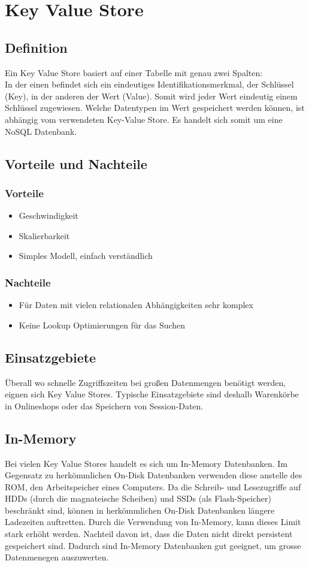 \section{Key Value Store}
\subsection{Definition}
Ein Key Value Store basiert auf einer Tabelle mit genau zwei Spalten: \\
In der einen befindet sich ein eindeutiges Identifikationsmerkmal, der Schlüssel (Key), in der anderen der Wert (Value).
Somit wird jeder Wert eindeutig einem Schlüssel zugewiesen.
Welche Datentypen im Wert gespeichert werden können, ist abhängig vom verwendeten Key-Value Store.
Es handelt sich somit um eine NoSQL Datenbank.
\subsection{Vorteile und Nachteile}
\subsubsection{Vorteile}
\begin{itemize}
	\item Geschwindigkeit
	\item Skalierbarkeit
	\item Simples Modell, einfach verständlich
\end{itemize}
\subsubsection{Nachteile}
\begin{itemize}
	\item Für Daten mit vielen relationalen Abhängigkeiten sehr komplex
	\item Keine Lookup Optimierungen für das Suchen
\end{itemize}
\subsection{Einsatzgebiete}
Überall wo schnelle Zugriffszeiten bei großen Datenmengen benötigt werden, eignen sich Key Value Stores. Typische Einsatzgebiete sind deshalb Warenkörbe in Onlineshops oder das Speichern von Session-Daten.

\subsection{In-Memory}
Bei vielen Key Value Stores handelt es sich um In-Memory Datenbanken. Im Gegensatz zu herkömmlichen On-Disk Datenbanken verwenden diese anstelle des ROM, den Arbeitspeicher eines Computers. Da die Schreib- und Lesezugriffe auf HDDs (durch die magnateische Scheiben) und SSDs (als Flash-Speicher) beschränkt sind, können in herkömmlichen On-Disk Datenbanken längere Ladezeiten auftretten. Durch die Verwendung von In-Memory, kann dieses Limit stark erhöht werden. Nachteil davon ist, dass die Daten nicht direkt persistent gespeichert sind.
Dadurch sind In-Memory Datenbanken gut geeignet, um grosse Datenmenegen auszuwerten.
\clearpage
